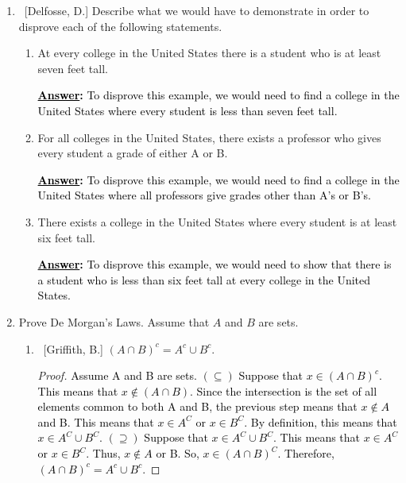 \documentclass[10pt]{article}
\begin{document}
\begin{enumerate}
\begin{enumerate}
	\end{enumerate}

\item  ~[Delfosse, D.] Describe what we would have to demonstrate in order to disprove each of the following statements.

	\begin{enumerate}
	
	\item  At every college in the United States there is a student who is at least seven feet tall.
 	 \par \medskip
  \textbf{\textcolor{black}{\underline{Answer}:}}
{\textcolor{black}{To disprove this example, we would need to find a college in the United States where every student is less than seven feet tall.}}
	
	\item  For all colleges in the United States, there exists a professor who gives every student a grade of either A or B.
 	\par \medskip
  \textbf{\textcolor{black}{\underline{Answer}:}}
{\textcolor{black}{To disprove this example, we would need to find a college in the United States where all professors give grades other than A's or B's.}}
	
	\item  There exists a college in the United States where every student is at least six feet tall.
 	 \par \medskip
  \textbf{\textcolor{black}{\underline{Answer}:}}
{\textcolor{black}{To disprove this example, we would need to show that there is a student who is less than six feet tall at every college in the United States.}}
	
	\end{enumerate}

\item\label{prob:DeMorgan}  Prove De Morgan's Laws.  Assume that $A$ and $B$ are sets.

	\begin{enumerate}
	
	\item  ~[Griffith, B.] $\left( A \cap B \right)^{c} = A^{c} \cup B^{c}$.
\begin{proof}
{\textcolor{black}{Assume A and B are sets. $(\subseteq)$ Suppose that $x \in \left( A \cap B \right)^{c}$.  This means that $x \notin (A \cap B)$.  Since the intersection is the set of all elements common to both A and B, the previous step means that $x \notin A $ and B.  This means that $x \in A^C$ or $x \in B^C$.  By definition, this means that $x \in A^C \cup B^C$. $(\supseteq)$ Suppose that $x \in A^C \cup B^C$.  This means that $x \in A^C$ or $x \in B^C$.  Thus, $x \notin A$ or B.  So, $x \in (A \cap B)^C$. Therefore, $\left( A \cap B \right)^{c} = A^{c} \cup B^{c}$.}}
\end{proof}


\end{enumerate}
\end{enumerate}
\end{document}
